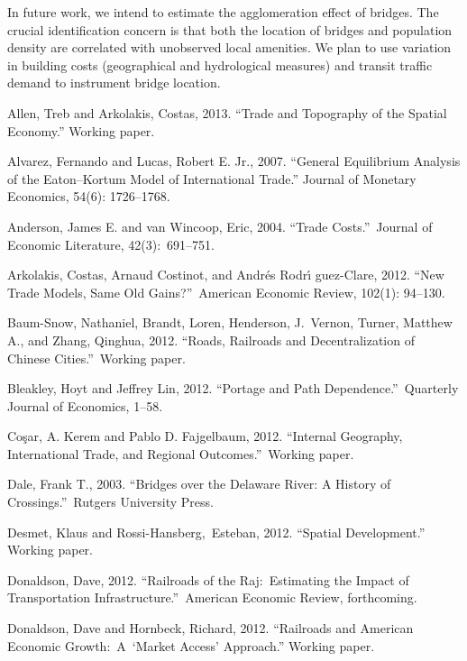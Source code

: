 \documentclass[12pt]{article}
\begin{document}
In future work, we intend to estimate the agglomeration effect of bridges. The crucial identification concern is that both the location of bridges and population density are correlated with unobserved local amenities. We plan to use variation in building costs (geographical and hydrological measures) and transit traffic demand to instrument bridge location. 

\begin{thebibliography}{99}
\bibitem{} Allen, Treb and Arkolakis, Costas, 2013. ``Trade and Topography of
the Spatial Economy.'' Working paper.

\bibitem{} Alvarez, Fernando and Lucas, Robert E. Jr., 2007. ``General
Equilibrium Analysis of the Eaton--Kortum Model of International Trade.''
Journal of Monetary Economics, 54(6): 1726--1768.

\bibitem{} Anderson, James E. and van Wincoop, Eric, 2004. ``Trade Costs.''\
Journal of Economic Literature, 42(3):\ 691--751.

\bibitem{} Arkolakis, Costas, Arnaud Costinot, and Andr\'{e}s Rodr\'{\i}%
guez-Clare, 2012. \textquotedblleft New Trade Models, Same Old
Gains?\textquotedblright \ American Economic Review, 102(1): 94--130.

\bibitem{} Baum-Snow, Nathaniel, Brandt, Loren, Henderson, J.\ Vernon,
Turner, Matthew A., and Zhang, Qinghua, 2012. ``Roads, Railroads and
Decentralization of Chinese Cities.''\ Working paper.

\bibitem{} Bleakley, Hoyt and Jeffrey Lin, 2012. \textquotedblleft Portage
and Path Dependence.''\ Quarterly Journal of Economics, 1--58.

\bibitem{} Co\c{s}ar, A. Kerem and Pablo D. Fajgelbaum, 2012.
\textquotedblleft Internal Geography, International Trade, and Regional
Outcomes.\textquotedblright \ Working paper.

\bibitem{} Dale, Frank T., 2003. \textquotedblleft Bridges over the Delaware
River: A History of Crossings.\textquotedblright \ Rutgers University Press.

\bibitem{} Desmet, Klaus and Rossi-Hansberg,\ Esteban, 2012. ``Spatial
Development.'' Working paper.

\bibitem{} Donaldson, Dave, 2012. ``Railroads of the Raj:\ Estimating the
Impact of Transportation Infrastructure.''\ American Economic Review,
forthcoming.

\bibitem{} Donaldson, Dave and Hornbeck, Richard, 2012. ``Railroads and
American Economic Growth:\ A\ `Market Access' Approach.'' Working paper.


\end{thebibliography}
\end{document}
